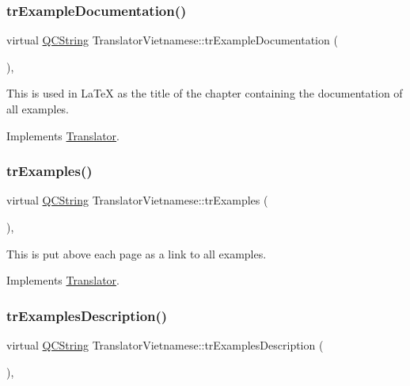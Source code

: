 \subsubsection{\texorpdfstring{trExampleDocumentation()}{trExampleDocumentation()}}
{\footnotesize\ttfamily virtual \mbox{\hyperlink{class_q_c_string}{Q\+C\+String}} Translator\+Vietnamese\+::tr\+Example\+Documentation (\begin{DoxyParamCaption}{ }\end{DoxyParamCaption})\hspace{0.3cm}{\ttfamily [inline]}, {\ttfamily [virtual]}}

This is used in La\+TeX as the title of the chapter containing the documentation of all examples. 

Implements \mbox{\hyperlink{class_translator}{Translator}}.

\mbox{\label{class_translator_vietnamese_aec70e499c88c890ad2c06092d5faa4d3}} 
\subsubsection{\texorpdfstring{trExamples()}{trExamples()}}
{\footnotesize\ttfamily virtual \mbox{\hyperlink{class_q_c_string}{Q\+C\+String}} Translator\+Vietnamese\+::tr\+Examples (\begin{DoxyParamCaption}{ }\end{DoxyParamCaption})\hspace{0.3cm}{\ttfamily [inline]}, {\ttfamily [virtual]}}

This is put above each page as a link to all examples. 

Implements \mbox{\hyperlink{class_translator}{Translator}}.

\mbox{\label{class_translator_vietnamese_aff6b91ca8b47558aa4f9aed938d3297c}} 
\subsubsection{\texorpdfstring{trExamplesDescription()}{trExamplesDescription()}}
{\footnotesize\ttfamily virtual \mbox{\hyperlink{class_q_c_string}{Q\+C\+String}} Translator\+Vietnamese\+::tr\+Examples\+Description (\begin{DoxyParamCaption}{ }\end{DoxyParamCaption})\hspace{0.3cm}{\ttfamily [inline]}, {\ttfamily [virtual]}}

